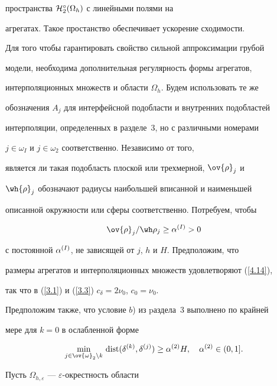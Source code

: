 пространства ${\cal H}^\circ_2(\Omega_h)$ с линейными полями на


агрегатах. Такое простанство обеспечивает ускорение сходимости.





Для того чтобы гарантировать свойство сильной аппроксимации грубой


модели, необходима дополнительная регулярность формы агрегатов,


интерполяционных множеств и области $\Omega_h$. Будем использовать те же


обозначения $A_j$ для интерфейсной подобласти и внутренних подобластей


интерполяции, определенных в разделе~3, но с различными номерами


$j\in\omega_I$ и $j\in\omega_2$ соответственно. Независимо от того,


является ли такая подобласть плоской или трехмерной, $\ov{\rho}_j$ и


$\wh{\rho}_j$ обозначают радиусы наибольшей вписанной и наименьшей


описанной окружности или сферы соответственно. Потребуем, чтобы


\begin{equation}\label{5.1}


\ov{\rho}_j/\wh \rho_j\ge\alpha\up I>0


\end{equation}


с постоянной $\alpha^{(I)}$, не зависящей от $j$, $h$ и $H$. Предположим, что


размеры агрегатов и интерполяционных множеств удовлетворяют (\ref{4.14}),


так что в (\ref{3.1}) и (\ref{3.3}) $c_\delta=2\nu_0$, $c_0=\nu_0$.


Предположим также, что условие $b$) из pаздела~3 выполнено по крайней


мере для $k=0$ в ослабленной форме


$$


\min_{j\in\ov{\omega}_2\setminus k}\,


\dist(\delta\up k, \delta\up j)\ge\alpha\up


2H,\quad\alpha\up 2\in(0,1].


$$





Пусть $\Omega_{h,\varepsilon}$ --- $\varepsilon$-окрестность области


